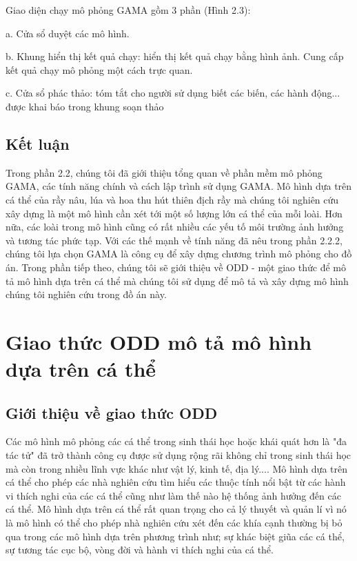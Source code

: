 \documentclass[13pt]{extreport}
\begin{document}
Giao diện chạy mô phỏng  GAMA gồm 3 phần (Hình 2.3):

a.  Cửa sổ duyệt  các mô hình.

b.  Khung  hiển thị kết quả chạy: hiển thị kết quả chạy bằng hình ảnh.
Cung  cấp kết quả chạy mô phỏng  một  cách trực  quan.

c.  Cửa  sổ phác  thảo:  tóm  tắt cho người sử dụng  biết  các biến,  các hành  động... được  khai báo trong  khung  soạn thảo

\subsection{Kết luận}
\indent Trong phần 2.2, chúng tôi đã giới thiệu tổng quan về phần mềm mô phỏng GAMA, các tính năng chính và cách lập trình sử dụng GAMA. Mô hình dựa trên cá thể của rầy nâu, lúa và hoa thu hút thiên địch rầy mà chúng tôi nghiên cứu xây dựng là một mô hình cần xét tới một số lượng lớn cá thể của mỗi loài. Hơn nữa, các loài trong mô hình cũng có rất nhiều các yếu tố môi trường ảnh hưởng và tương tác phức tạp. Với các thế mạnh về tính năng đã nêu trong phần 2.2.2, chúng tôi lựa chọn GAMA là công cụ để xây dựng chương trình mô phỏng cho đồ án. Trong phần tiếp theo, chúng tôi sẽ giới thiệu về ODD - một giao thức để mô tả mô hình dựa trên cá thể mà chúng tôi sử dụng để mô tả và xây dựng mô hình chúng tôi nghiên cứu trong đồ án này.

\section{Giao thức ODD mô tả mô hình dựa trên cá thể}
\subsection{Giới thiệu về giao thức ODD}
\indent Các mô hình mô phỏng các cá thể trong sinh thái học hoặc khái quát hơn là "đa tác tử" đã trở thành công cụ được sử dụng rộng rãi không chỉ trong sinh thái học mà còn trong nhiều lĩnh vực khác như vật lý, kinh tế, địa lý.... Mô hình dựa trên cá thể cho phép các nhà nghiên cứu tìm hiểu các thuộc tính nổi bật từ các hành vi thích nghi của các cá thể cũng như làm thế nào hệ thống ảnh hưởng đến các cá thể. Mô hình dựa trên cá thể rất quan trọng cho cả lý thuyết và quản lí vì nó là mô hình có thể cho phép nhà nghiên cứu xét đến các khía cạnh thường bị bỏ qua trong các mô hình dựa trên phương trình như; sự khác biệt giũa các cá thể, sự tương tác cục bộ, vòng đời và hành vi thích nghi của cá thể.
\end{document}
